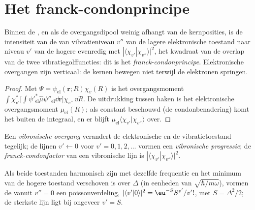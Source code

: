 \section{Het franck-condonprincipe}

\begin{theorem}\label{thm:b3:electronic-spectroscopy:franck-condon}
Binnen de , en als de overgangsdipool weinig
afhangt van de kernposities, is de intensiteit van de  van vibratieniveau $v''$ van de lagere elektronische toestand
naar niveau $v'$ van de hogere evenredig met $|\langle\chi_{v'}|\chi_{v''}\rangle|^2$, het
kwadraat van de overlap van de twee vibratiegolffuncties: dit is het
\emph{franck-condonprincipe}. Elektronische
overgangen zijn verticaal: de kernen bewegen niet terwijl de elektronen
springen.
\end{theorem}

\begin{proof}
Met $\Psi = \psi_{\mathrm{el}}(\mathbf r;R)\chi_v(R)$ is het overgangsmoment
$\int\chi_{v'}^*\big[\int\psi'^*_{\mathrm{el}}\hat\mu\psi''_{\mathrm{el}}\dd\mathbf r\big]
\chi_{v''}\,\dd R$. De uitdrukking tussen haken is het elektronische
overgangsmoment
$\mu_{\mathrm{el}}(R)$; als constant beschouwd (de condonbenadering)
komt het buiten
de integraal, en er blijft $\mu_{\mathrm{el}}\langle\chi_{v'}|\chi_{v''}\rangle$ over.
\end{proof}

\begin{definition}\label{def:b3:electronic-spectroscopy:vibronic}
Een \emph{vibronische overgang} verandert de
elektronische en de vibratietoestand tegelijk; de lijnen $v' \leftarrow 0$ voor $v' = 0, 1, 2,
\dots$ vormen een \emph{vibronische progressie}; de
\emph{franck-condonfactor} van een vibronische
lijn is
$|\langle\chi_{v'}|\chi_{v''}\rangle|^2$.
\end{definition}

\begin{proposition}\label{prop:b3:electronic-spectroscopy:displaced}
Als beide toestanden harmonisch zijn met dezelfde frequentie en het
minimum van de hogere toestand verschoven is over $\Delta$ (in eenheden van
$\sqrt{\hbar/m\omega}$), vormen de  vanuit $v'' = 0$
een poissonverdeling,
$|\langle v'|0\rangle|^2 = \eu^{-S}S^{v'}/v'!$, met $S = \Delta^2/2$; de sterkste
lijn ligt bij ongeveer $v' = S$.
\end{proposition}
\admitted

